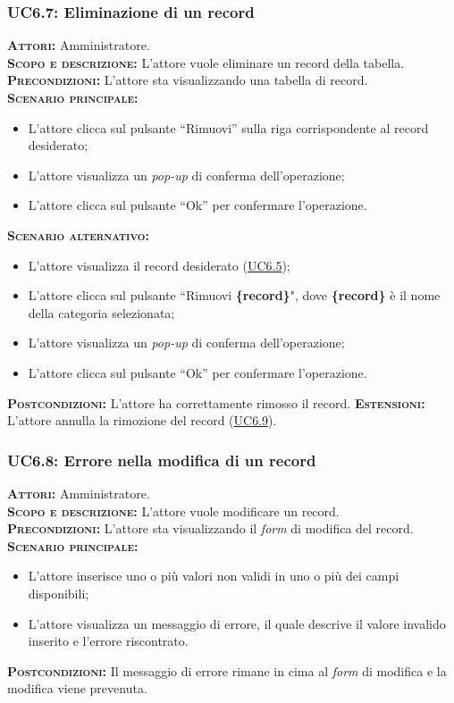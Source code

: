 \subsubsection{UC6.7: Eliminazione di un record}
\label{sec:UC67}
\textsc{\textbf{Attori:}} Amministratore.\\
\textsc{\textbf{Scopo e descrizione:}} L'attore vuole eliminare un record della tabella.\\
\textsc{\textsc{\textbf{Precondizioni:}}} L'attore sta visualizzando una tabella di record.\\
\textsc{\textbf{Scenario principale:}}
\begin{itemize}
    \item L'attore clicca sul pulsante ``Rimuovi'' sulla riga corrispondente al record desiderato;
    \item L'attore visualizza un \textit{pop-up} di conferma dell'operazione;
    \item L'attore clicca sul pulsante ``Ok'' per confermare l'operazione.
\end{itemize}
\textsc{\textbf{Scenario alternativo:}}
\begin{itemize}
    \item L'attore visualizza il record desiderato (\hyperref[sec:UC65]{UC6.5});
    \item L'attore clicca sul pulsante ``Rimuovi \textbf{\{record\}}", dove \textbf{\{record\}} è il nome della categoria selezionata;
    \item L'attore visualizza un \textit{pop-up} di conferma dell'operazione;
    \item L'attore clicca sul pulsante ``Ok'' per confermare l'operazione.
\end{itemize}
\textsc{\textbf{Postcondizioni:}} L'attore ha correttamente rimosso il record.
\textsc{\textbf{Estensioni:}} L'attore annulla la rimozione del record (\hyperref[sec:UC69]{UC6.9}).

\subsubsection{UC6.8: Errore nella modifica di un record}
\label{sec:UC68}
\textsc{\textbf{Attori:}} Amministratore.\\
\textsc{\textbf{Scopo e descrizione:}} L'attore vuole modificare un record.\\
\textsc{\textsc{\textbf{Precondizioni:}}} L'attore sta visualizzando il \textit{form} di modifica del record.\\
\textsc{\textbf{Scenario principale:}} 
\begin{itemize}
    \item L'attore inserisce uno o più valori non validi in uno o più dei campi disponibili;
    \item L'attore visualizza un messaggio di errore, il quale descrive il valore invalido inserito e l'errore riscontrato.
\end{itemize}
\textsc{\textbf{Postcondizioni:}} Il messaggio di errore rimane in cima al \textit{form} di modifica e la modifica viene prevenuta.

